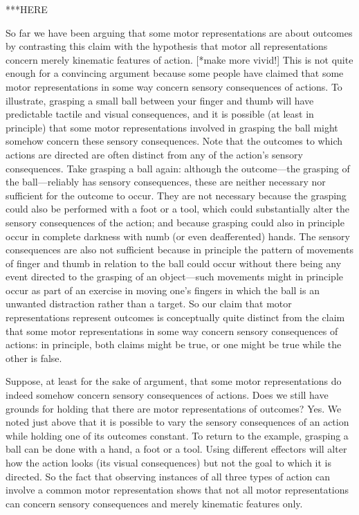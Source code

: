 \documentclass[12pt,\papersize]{extarticle}
\begin{document}
***HERE

So far we have been arguing that some motor representations are about outcomes by contrasting this claim with the hypothesis that motor all representations concern merely kinematic features of action.  [*make more vivid!]  This is not quite enough for a convincing argument because some people have claimed that some motor representations in some way concern sensory consequences of actions.
To illustrate, grasping a small ball between your finger and thumb will have predictable tactile and visual consequences, and it is possible (at least in principle) that some motor representations involved in grasping the ball might somehow concern these sensory consequences.
Note that the outcomes to which actions are directed are often distinct from any of the action's sensory consequences.
Take grasping a ball again: although the outcome---the grasping of the ball---reliably has sensory consequences, these are neither necessary nor sufficient for the outcome to occur.  
They are not necessary because the grasping could also be performed with a foot or a tool, which could substantially alter the sensory consequences of the action; and because grasping could also in principle occur in complete darkness with numb (or even deafferented) hands. 
The sensory consequences are also not sufficient because in principle the pattern of movements of finger and thumb in relation to the ball could occur without there being any event directed to the grasping of an object---such movements might in principle occur as part of an exercise in moving one's fingers in which the ball is an unwanted distraction rather than a target.
So our claim that motor representations represent outcomes is conceptually quite distinct from the claim that some motor representations in some way concern sensory consequences of actions: in principle, both claims might be true, or one might be true while the other is false.

Suppose, at least for the sake of argument, that some motor representations do indeed somehow concern sensory consequences of actions. 
Does we still have grounds for holding that there are motor representations of outcomes?  Yes.  We noted just above that it is possible to vary the sensory consequences of an action while holding one of its outcomes constant.  
To return to the example, grasping a ball can be done with a hand, a foot or a tool.
Using different effectors will alter how the action looks (its visual consequences) but not the goal to which it is directed. 
So the fact that observing instances of all three types of action can involve a common motor representation shows that not all motor representations can concern sensory consequences and merely kinematic features only.
\end{document}
